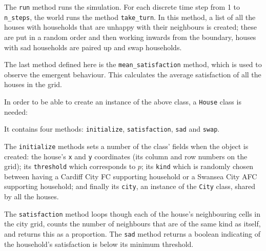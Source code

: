 The \texttt{run} method runs the simulation. For each discrete time
step from 1 to \texttt{n_steps}, the world runs the method
\texttt{take_turn}.
In this method, a list of all the houses with households that
are unhappy with their neighbours is created;
these are put in a random order and then working inwards from the boundary,
houses with sad households are paired up and swap households.

The last method defined here is the \texttt{mean_satisfaction}
method, which is used to observe the emergent behaviour.
This calculates the average satisfaction of all the houses in the grid.

In order to be able to create an instance of the above class,
a \texttt{House} class is needed:


It contains four methods: \texttt{initialize},
\texttt{satisfaction}, \texttt{sad} and \texttt{swap}.

The \texttt{initialize} methods sets a number of the class' fields when
the object is created: the house's \texttt{x} and \texttt{y}
coordinates (its column and row numbers on the grid); its
\texttt{threshold} which corresponds to \(p\); its \texttt{kind}
which is randomly chosen between having a Cardiff City
FC supporting household or a Swansea City AFC supporting household; and finally
its \texttt{city}, an instance of the \texttt{City} class, shared
by all the houses.

The \texttt{satisfaction} method loops though each of the house's
neighbouring cells in the city grid, counts the number of neighbours that are of
the same kind as itself, and returns this as a proportion.
The \texttt{sad} method returns a boolean indicating of the
household's satisfaction is below its minimum threshold.

